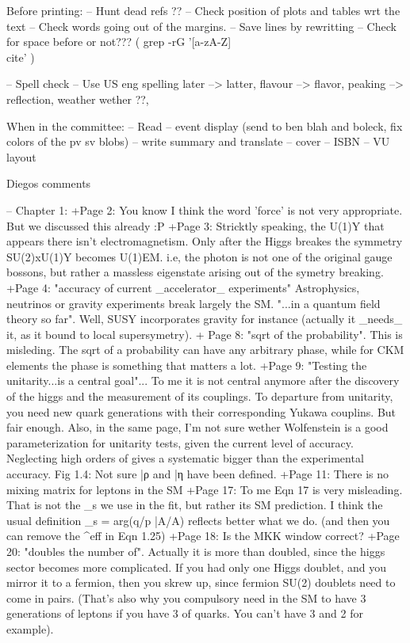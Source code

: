 Before printing:
-- Hunt dead refs ??
-- Check position of plots and tables wrt the text
-- Check words going out of the margins.
-- Save lines by rewritting
-- Check for space before \cite{} or not??? ( grep -rG  '[a-zA-Z]\\cite' )

-- Spell check
-- Use US eng spelling  later --> latter, flavour --> flavor, peaking --> reflection, weather wether ??,

When in the committee:
-- Read
-- event display (send to ben blah and boleck, fix colors of the pv sv blobs)
-- write summary and translate
-- cover
-- ISBN
-- VU layout

Diegos comments

-- Chapter 1:
+Page 2: You know I think the word 'force' is not very appropriate. But we discussed this already :P
+Page 3: Stricktly speaking, the U(1)Y that appears there isn't electromagnetism. Only after the Higgs
breakes the symmetry SU(2)xU(1)Y becomes U(1)EM. i.e, the photon is not one of the original gauge
bossons, but rather a massless eigenstate arising out of the symetry breaking.
+Page 4: "accuracy of current _accelerator_ experiments" Astrophysics, neutrinos or gravity experiments
break largely the SM.
 "...in a quantum field theory so far". Well, SUSY incorporates gravity for instance (actually it _needs_ it,
as it bound to local supersymetry).
+ Page 8: "sqrt of the probability". This is misleding. The sqrt of a probability can have any arbitrary phase,
while for CKM elements the phase is something that matters a lot.
+Page 9: "Testing the unitarity...is a central goal"... To me it is not central anymore after the discovery
of the higgs and the measurement of its couplings. To departure from unitarity, you need new quark
generations with their corresponding Yukawa couplins. But fair enough.
 Also, in the same page, I'm not sure wether Wolfenstein is a good parameterization for unitarity tests,
given the current level of accuracy. Neglecting high orders of \lambda gives a systematic bigger than
the experimental accuracy.
Fig 1.4: Not sure \bar{ρ} and \bar{η} have been defined.
+Page 11: There is no mixing matrix for leptons in the SM
+Page 17: To me Eqn 17 is very misleading. That is not the \phi_s we use in the fit, but rather its
SM prediction. I think the usual definition \phi_s = arg(q/p \bar{A}/{A}) reflects better what we do.
(and then you can remove the ^{eff} in Eqn 1.25)
+Page 18: Is the MKK window correct?
+Page 20: "doubles the number of". Actually it is more than doubled, since the higgs sector becomes
more complicated. If you had only one Higgs doublet, and you mirror it to a fermion, then you skrew
up, since fermion SU(2) doublets need to come in pairs. (That's also why you compulsory need in the
SM to have 3 generations of leptons if you have 3 of quarks. You can't have 3 and 2 for example).

